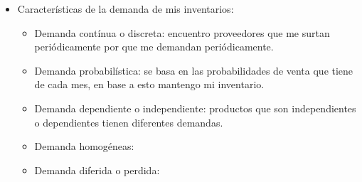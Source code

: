 \begin{itemize}
    \item Características de la demanda de mis inventarios:
        \begin{itemize}
            \item Demanda contínua o discreta: encuentro proveedores que me surtan periódicamente por que me demandan periódicamente.
            \item Demanda probabilística: se basa en las probabilidades de venta que tiene de cada mes, en base a esto mantengo mi inventario.
            \item Demanda dependiente o independiente: productos que son independientes o dependientes tienen diferentes demandas.
            \item Demanda homogéneas: 
            \item Demanda diferida o perdida: 
        \end{itemize}
\end{itemize}
